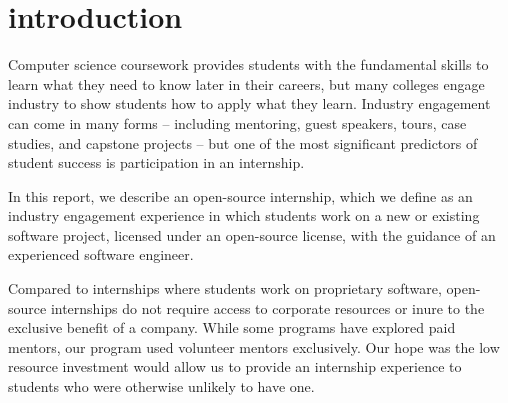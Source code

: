 \section{introduction}

Computer science coursework provides students with the fundamental skills to learn what they need to know later in their careers, but many colleges engage industry to show students how to apply what they learn. \cite{beaubouefComputerScienceCurriculum2011} Industry engagement can come in many forms – including mentoring, guest speakers, tours, case studies, and capstone projects – but one of the most significant predictors of student success is participation in an internship. \cite{callananAssessingRoleInternships2004}

In this report, we describe an open-source internship, which we define as an industry engagement experience in which students work on a new or existing software project, licensed under an open-source license, with the guidance of an experienced software engineer.

Compared to internships where students work on proprietary software, open-source internships do not require access to corporate resources or inure to the exclusive benefit of a company. While some programs have explored paid mentors, \cite{silvaStudentsEngagementOpen2017} our program used volunteer mentors exclusively. Our hope was the low resource investment would allow us to provide an internship experience to students who were otherwise unlikely to have one.

